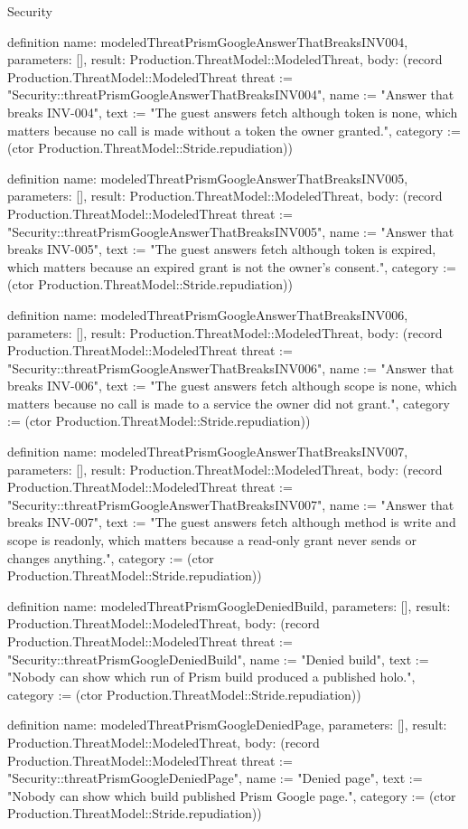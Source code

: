 \begin{lexlean}{Security}
\begin{semanticmodule}
definition{
  name: modeledThreatPrismGoogleAnswerThatBreaksINV004,
  parameters: [],
  result: Production.ThreatModel::ModeledThreat,
  body: (record Production.ThreatModel::ModeledThreat {threat := "Security::threatPrismGoogleAnswerThatBreaksINV004", name := "Answer that breaks INV-004", text := "The guest answers fetch although token is none, which matters because no call is made without a token the owner granted.", category := (ctor Production.ThreatModel::Stride.repudiation)})
}

definition{
  name: modeledThreatPrismGoogleAnswerThatBreaksINV005,
  parameters: [],
  result: Production.ThreatModel::ModeledThreat,
  body: (record Production.ThreatModel::ModeledThreat {threat := "Security::threatPrismGoogleAnswerThatBreaksINV005", name := "Answer that breaks INV-005", text := "The guest answers fetch although token is expired, which matters because an expired grant is not the owner's consent.", category := (ctor Production.ThreatModel::Stride.repudiation)})
}

definition{
  name: modeledThreatPrismGoogleAnswerThatBreaksINV006,
  parameters: [],
  result: Production.ThreatModel::ModeledThreat,
  body: (record Production.ThreatModel::ModeledThreat {threat := "Security::threatPrismGoogleAnswerThatBreaksINV006", name := "Answer that breaks INV-006", text := "The guest answers fetch although scope is none, which matters because no call is made to a service the owner did not grant.", category := (ctor Production.ThreatModel::Stride.repudiation)})
}

definition{
  name: modeledThreatPrismGoogleAnswerThatBreaksINV007,
  parameters: [],
  result: Production.ThreatModel::ModeledThreat,
  body: (record Production.ThreatModel::ModeledThreat {threat := "Security::threatPrismGoogleAnswerThatBreaksINV007", name := "Answer that breaks INV-007", text := "The guest answers fetch although method is write and scope is readonly, which matters because a read-only grant never sends or changes anything.", category := (ctor Production.ThreatModel::Stride.repudiation)})
}

definition{
  name: modeledThreatPrismGoogleDeniedBuild,
  parameters: [],
  result: Production.ThreatModel::ModeledThreat,
  body: (record Production.ThreatModel::ModeledThreat {threat := "Security::threatPrismGoogleDeniedBuild", name := "Denied build", text := "Nobody can show which run of Prism build produced a published holo.", category := (ctor Production.ThreatModel::Stride.repudiation)})
}

definition{
  name: modeledThreatPrismGoogleDeniedPage,
  parameters: [],
  result: Production.ThreatModel::ModeledThreat,
  body: (record Production.ThreatModel::ModeledThreat {threat := "Security::threatPrismGoogleDeniedPage", name := "Denied page", text := "Nobody can show which build published Prism Google page.", category := (ctor Production.ThreatModel::Stride.repudiation)})
}


\end{semanticmodule}
\end{lexlean}
